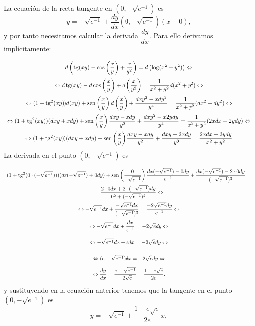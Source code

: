 {La ecuación de la recta tangente en $(0,-\sqrt{e^{-1}})$ es
\begin{equation}
y = -\sqrt{e^{-1}} + \frac{dy}{dx}(0,-\sqrt{e^{-1}})(x-0),
\end{equation}
y por tanto necesitamos calcular la derivada $\dfrac{dy}{dx}$. Para ello derivamos implícitamente:
\[
\renewcommand{\arraystretch}{2.5}
\begin{array}{c}
\displaystyle
d\left(\tg(xy)-\cos\left( \frac{x}{y}\right)+\frac{x}{y^2}\right) = d\left( \log (x^2+y^2)\right) \Leftrightarrow \\ \displaystyle
\Leftrightarrow
d\tg(xy)-d\cos\left(\frac{x}{y}\right)+d\left( \frac{x}{y^2}\right)=
\frac{1}{x^2+y^2}d(x^2+y^2) \Leftrightarrow \\ \displaystyle
\Leftrightarrow
(1+\tg^2(xy))d(xy)+\sen\left( \frac{x}{y}\right)d\left( \frac{x}{y}\right) +\frac{dxy^2-xdy^2}{y^4} =
\frac{1}{x^2+y^2}(dx^2+dy^2) \Leftrightarrow \\ \displaystyle
\Leftrightarrow
(1+\tg^2(xy))(dxy+xdy)+\sen\left( \frac{x}{y}\right) \frac{dxy-xdy}{y^2}+\frac{dxy^2-x2ydy}{y^4} =
\frac{1}{x^2+y^2}(2xdx+2ydy) \Leftrightarrow \\ \displaystyle
\Leftrightarrow
(1+\tg^2(xy))(dxy+xdy)+\sen\left(\frac{x}{y}\right)\frac{dxy-xdy}{y^2}+\frac{dxy-2xdy}{y^3} =
\frac{2xdx+2ydy}{x^2+y^2}
\end{array}
\]
La derivada en el punto $(0,-\sqrt{e^{-1}})$ es 
\[
\renewcommand{\arraystretch}{2.5}
\begin{array}{c}\displaystyle
(1+\tg^2(0\cdot
(-\sqrt{e^{-1}})))(dx(-\sqrt{e^{-1}})+0dy)+\sen\left(\frac{0}{-\sqrt{e^{-1}}}\right)\frac{dx(-\sqrt{e^{-1}})-0dy}{e^{-1}}+\frac{dx(-\sqrt{e^{-1}})-2\cdot 0dy}{(-\sqrt{e^{-1}})^3} =\\ 
\displaystyle
= \frac{2\cdot 0dx+2\cdot (-\sqrt{e^{-1}})dy}{0^2+(-\sqrt{e^{-1}})^2}
\Leftrightarrow\\ \displaystyle
\Leftrightarrow -\sqrt{e^{-1}}dx+\frac{-\sqrt{e^{-1}}dx}{(-\sqrt{e^{-1}})^3} = \frac{-2\sqrt{e^{-1}}dy}{e^{-1}} \Leftrightarrow\\ \displaystyle
\Leftrightarrow -\sqrt{e^{-1}}dx+\frac{dx}{e^{-1}} =
-2\sqrt{e}dy \Leftrightarrow\\ \displaystyle
\Leftrightarrow -\sqrt{e^{-1}}dx+edx = -2\sqrt{e}dy \Leftrightarrow\\
\displaystyle \Leftrightarrow (e-\sqrt{e^{-1}})dx = -2\sqrt{e}dy
\Leftrightarrow\\ 
\displaystyle \Leftrightarrow \frac{dy}{dx} =
\frac{e-\sqrt{e^{-1}}}{-2\sqrt{e}} = \frac{1-e\sqrt{e}}{2e}.
\end{array}
\]
y sustituyendo en la ecuación anterior tenemos que la tangente en el punto  $(0,-\sqrt{e^{-1}})$ es
\[
y = -\sqrt{e^{-1}} + \frac{1-e\sqrt{e}}{2e} x,
\]

}
